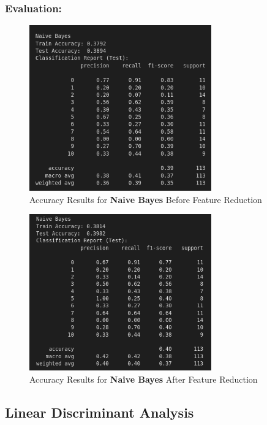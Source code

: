 \documentclass[a4paper,12pt]{article}
\begin{document}
\subsubsection{Evaluation:}
\begin{figure}[H]
    \centering
    \includegraphics[width=0.7\textwidth]{./images/nbacc1.png}
    \caption{Accuracy Results for \textbf{Naive Bayes} Before Feature Reduction}
    \label{fig:fig_13}
\end{figure}
\begin{figure}[H]
    \centering
    \includegraphics[width=0.7\textwidth]{./images/nbacc2.png}
    \caption{Accuracy Results for \textbf{Naive Bayes} After Feature Reduction}
    \label{fig:fig_14}
\end{figure}

\subsection{Linear Discriminant Analysis}
\end{document}
